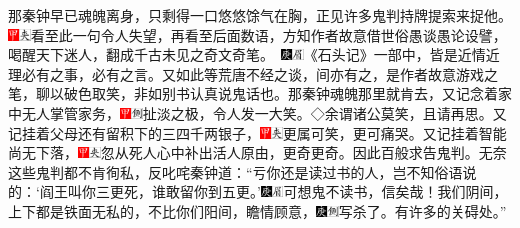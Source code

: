 那秦钟早已魂魄离身，只剩得一口悠悠馀气在胸，正见许多鬼判持牌提索来捉他。{\includegraphics[width=3mm]{../Images/00002}\includegraphics[width=3mm]{../Images/00012}\footnotesize \kaishu 看至此一句令人失望，再看至后面数语，方知作者故意借世俗愚谈愚论设譬，喝醒天下迷人，翻成千古未见之奇文奇笔。　\includegraphics[width=3mm]{../Images/00004}\includegraphics[width=3mm]{../Images/00010}\footnotesize \kaishu 《石头记》一部中，皆是近情近理必有之事，必有之言。又如此等荒唐不经之谈，间亦有之，是作者故意游戏之笔，聊以破色取笑，非如别书认真说鬼话也。}那秦钟魂魄那里就肯去，又记念着家中无人掌管家务，{\includegraphics[width=3mm]{../Images/00002}\includegraphics[width=3mm]{../Images/00011}\footnotesize \kaishu 扯淡之极，令人发一大笑。◇余谓诸公莫笑，且请再思。}又记挂着父母还有留积下的三四千两银子，{\includegraphics[width=3mm]{../Images/00002}\includegraphics[width=3mm]{../Images/00012}\footnotesize \kaishu 更属可笑，更可痛哭。}又记挂着智能尚无下落，{\includegraphics[width=3mm]{../Images/00002}\includegraphics[width=3mm]{../Images/00012}\footnotesize \kaishu 忽从死人心中补出活人原由，更奇更奇。}因此百般求告鬼判。无奈这些鬼判都不肯徇私，反叱咤秦钟道：``亏你还是读过书的人，岂不知俗语说的：`阎王叫你三更死，谁敢留你到五更。'{\includegraphics[width=3mm]{../Images/00004}\includegraphics[width=3mm]{../Images/00010}\footnotesize \kaishu 可想鬼不读书，信矣哉！}我们阴间，上下都是铁面无私的，不比你们阳间，瞻情顾意，{\includegraphics[width=3mm]{../Images/00004}\includegraphics[width=3mm]{../Images/00011}\footnotesize \kaishu 写杀了。}有许多的关碍处。''


